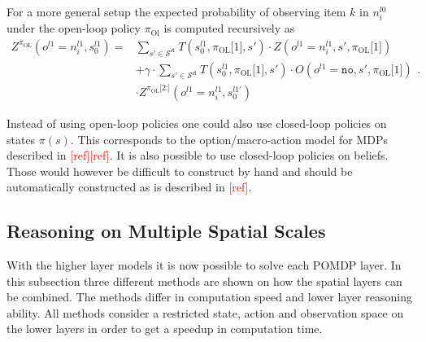 For a more general setup the expected probability of observing item $k$ in $n_i^{l0}$ under the open-loop policy $\pi_\text{Ol}$ is computed recursively as
\begin{equation}
    \begin{aligned}
        Z^{\pi_\text{OL}}\left( o^{l1}=n_i^{l1}, s_0^{l1}\right) = &\sum_{s'\in\mathcal{S^{l1}}} T\left( s_0^{l1}, \pi_\text{OL}\texttt{[$1$]}, s' \right) \cdot Z\left(o^{l1}=n_i^{l1}, s', \pi_\text{OL}\texttt{[$1$]}\right) \\
        &+ \gamma \cdot \sum_{s'\in\mathcal{S^{l1}}} T\left( s_0^{l1}, \pi_\text{OL}\texttt{[$1$]}, s' \right) \cdot O\left( o^{l1}=\texttt{no}, s', \pi_\text{OL}\texttt{[$1$]} \right)\\
        &\cdot Z^{\pi_\text{OL}\texttt{[$2$:]}}\left( o^{l1}=n_i^{l1}, s_0^{l1'} \right)
    \end{aligned}.
\end{equation}

Instead of using open-loop policies one could also use closed-loop policies on states $\pi(s)$. This corresponds to the option/macro-action model for MDPs described in \textcolor{red}{[ref][ref]}. It is also possible to use closed-loop policies on beliefs. Those would however be difficult to construct by hand and should be automatically constructed as is described in \textcolor{red}{[ref]}.


\subsection{Reasoning on Multiple Spatial Scales}
With the higher layer models it is now possible to solve each POMDP layer. In this subsection three different methods are shown on how the spatial layers can be combined. The methods differ in computation speed and lower layer reasoning ability. All methods consider a restricted state, action and observation space on the lower layers in order to get a speedup in computation time. 
%
